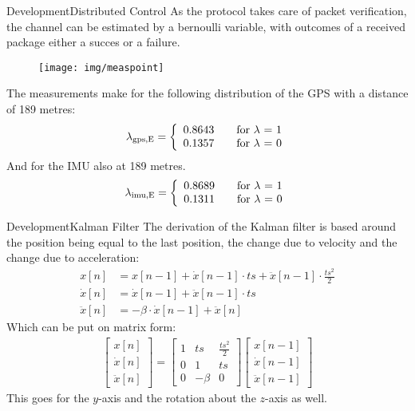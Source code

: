 \documentclass[10pt]{beamer}
\begin{document}
\begin{frame}{Development}{Distributed Control}
As the protocol takes care of packet verification, the channel can be estimated by a bernoulli variable, with outcomes of a received package either a succes or a failure.
\begin{figure}
	\begin{center}
		\texttt{[image: img/measpoint]}
		\label{fig:measpoint}
	\end{center}
\end{figure}
The measurements make for the following distribution of the GPS with a distance of 189 metres:
\begin{align}
\lambda_\text{gps,E} = \left\{ 
  \begin{array}{l l}
    0.8643 & \quad \text{for $\lambda$ = 1}\\
    0.1357 & \quad \text{for $\lambda$ = 0}
  \end{array} \right.
\end{align}
And for the IMU also at 189 metres.
\begin{align}
\lambda_\text{imu,E} = \left\{ 
  \begin{array}{l l}
    0.8689 & \quad \text{for $\lambda$ = 1}\\
    0.1311 & \quad \text{for $\lambda$ = 0}
  \end{array} \right.
\end{align}
\end{frame}

\begin{frame}{Development}{Kalman Filter}
The derivation of the Kalman filter is based around the position being equal to the last position, the change due to velocity and the change due to acceleration:
\begin{align}
x[n] &= x[n-1] + \dot{x}[n-1]\cdot ts + \ddot{x}[n-1]\cdot \frac{ts^2}{2}\\
\dot{x}[n] &= \dot{x}[n-1] + \ddot{x}[n-1] \cdot ts\\
\ddot{x}[n] &= -\beta \cdot \dot{x}[n-1] + \ddot{x}[n]
\end{align}
Which can be put on matrix form:
\begin{align}
\begin{bmatrix}
x[n]\\
\dot{x}[n]\\
\ddot{x}[n]
\end{bmatrix} = \begin{bmatrix}
1 & ts & \frac{ts^2}{2}\\
0 & 1 & ts\\
0 & -\beta & 0
\end{bmatrix}\begin{bmatrix}
x[n-1]\\
\dot{x}[n-1]\\
\ddot{x}[n-1]
\end{bmatrix}
\end{align}
This goes for the $y$-axis and the rotation about the $z$-axis as well.
\end{frame}
\end{document}
